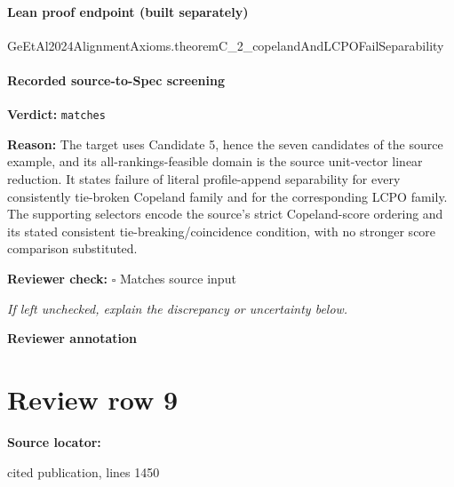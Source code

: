 \documentclass[10pt]{article}
\newcommand{\reviewerbox}{%
  \par\noindent\fbox{\parbox{0.96\linewidth}{\rule{0pt}{0.38in}}}\par
}
\newcommand{\reviewmatch}[1]{%
  \par\noindent\textbf{Reviewer check:} $\square$\; #1\par
  \noindent\emph{If left unchecked, explain the discrepancy or uncertainty below.}\par
}
\begin{document}
\paragraph{Lean proof endpoint (built separately)}\begin{ReviewVerbatim}
GeEtAl2024AlignmentAxioms.theoremC_2_copelandAndLCPOFailSeparability
\end{ReviewVerbatim}

\paragraph{Recorded source-to-Spec screening}
\textbf{Verdict:} \texttt{matches}
\\
{\raggedright
\textbf{Reason:} The target uses Candidate 5, hence the seven candidates of the source example, and its all-\allowbreak{}rankings-\allowbreak{}feasible domain is the source unit-\allowbreak{}vector linear reduction.\allowbreak{}  It states failure of literal profile-\allowbreak{}append separability for every consistently tie-\allowbreak{}broken Copeland family and for the corresponding LCPO family.\allowbreak{}  The supporting selectors encode the source's strict Copeland-\allowbreak{}score ordering and its stated consistent tie-\allowbreak{}breaking/\allowbreak{}coincidence condition, with no stronger score comparison substituted.\allowbreak{}
\par}
\reviewmatch{Matches source input}
\noindent\textbf{Reviewer annotation}\par
\reviewerbox
\clearpage
\hypertarget{source-claim-db88b9868ac40a8b}{}
\section*{Review row 9}
\textbf{Source locator:} {\footnotesize\raggedright cited publication, lines 1450\par}
\end{document}
